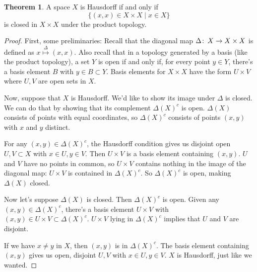 \documentclass[12pt]{article}
\def\co{\colon\thinspace}
\theoremstyle{definition}
\newtheorem*{unt}{Theorem}
\begin{document}

\begin{unt}
A space $X$ is Hausdorff if and only if $$ \{ (x,x)\in X\times X \mid x\in X\}$$ is closed in $X\times X$ under the product topology.
\end{unt}

\begin{proof}

First, some preliminaries:  Recall that the diagonal map $\Delta\co X\to X\times X$ is defined as $x\stackrel{\Delta}{\longmapsto}(x,x)$.  Also recall that in a topology generated by a basis (like the product topology), a set $Y$ is open if and only if, for every point $y\in Y$, there's a basis element $B$ with $y\in B\subset Y$.  Basis elements for $X\times X$ have the form $U\times V$ where $U,V$ are open sets in $X$.

Now, suppose that $X$ is Hausdorff.  We'd like to show its image under $\Delta$ is closed.  We can do that by showing that its complement $\Delta(X)^c$ is open.  $\Delta(X)$ consists of points with equal coordinates, so $\Delta(X)^c$ consists of points $(x,y)$ with $x$ and $y$ distinct.

For any $(x,y)\in \Delta(X)^c$, the Hausdorff condition gives us disjoint open $U,V\subset X$ with $x\in U, y\in V$.  Then $U\times V$ is a basis element containing $(x,y)$.  $U$ and $V$ have no points in common, so $U\times V$ contains nothing in the image of the diagonal map: $U\times V$ is contained in $\Delta(X)^c$.  So $\Delta(X)^c$ is open, making $\Delta(X)$ closed.

Now let's suppose $\Delta(X)$ is closed.  Then $\Delta(X)^c$ is open.  Given any $(x,y)\in\Delta(X)^c$, there's a basis element $U\times V$ with $(x,y)\in U\times V\subset\Delta(X)^c$.  $U\times V$ lying in $\Delta(X)^c$ implies that $U$ and $V$ are disjoint.

If we have $x\neq y$ in $X$, then $(x,y)$ is in $\Delta(X)^c$.  The basis element containing $(x,y)$ gives us open, disjoint $U,V$ with $x\in U, y\in V$.  $X$ is Hausdorff, just like we wanted.
\end{proof}
\end{document}

